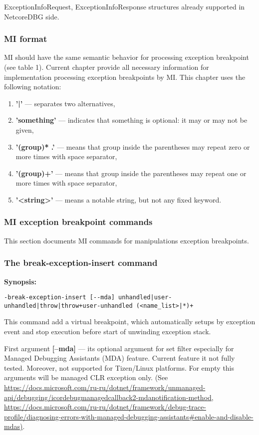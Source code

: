 \documentclass[a4paper,12pt]{article}
\newenvironment{nobr}{\begin{minipage}{\textwidth}\setlength\parskip{1em}
}{\end{minipage}\ignorespacesafterend}
\begin{document}
ExceptionInfoRequest, ExceptionInfoResponse structures already supported in NetcoreDBG side.

\subsubsection{MI format}
MI should have the same semantic behavior for processing exception breakpoint (see table 1). Current chapter provide all necessary information for implementation processing exception breakpoints by MI. This chapter uses the following notation:
\begin{enumerate}
 \item \textbf{'|'} --- separates two alternatives,
 \item \textbf{'something'} --- indicates that something is optional: it may or may not be given,
 \item \textbf{'(group)* .'} --- means that group inside the parentheses may repeat zero or more times with space separator,
 \item \textbf{'(group)+'} --- means that group inside the parentheses may repeat one or more times with space separator,
 \item \textbf{'<string>'} --- means a notable string, but not any fixed keyword.
\end{enumerate}

\subsubsection{MI exception breakpoint commands}
This section documents MI commands for manipulations exception breakpoints.

\begin{nobr}
\subsubsection{The break-exception-insert command}
\textbf{Synopsis:}
\begin{lstlisting}[style=cplusplus,numbers=none]
-break-exception-insert [--mda] unhandled|user-unhandled|throw|throw+user-unhandled (<name_list>|*)+
\end{lstlisting}
\end{nobr}

This command add a virtual breakpoint, which automatically setups by exception event and stop execution before start of unwinding exception stack.

First argument \textbf{[--mda]} --- its optional argument for set filter especially for Managed Debugging Assistants (MDA) feature. Current feature it not fully tested. Moreover, not supported for Tizen/Linux platforms. For empty this arguments will be managed CLR exception only. (See \url{https://docs.microsoft.com/ru-ru/dotnet/framework/unmanaged-api/debugging/icordebugmanagedcallback2-mdanotification-method}, \url{https://docs.microsoft.com/ru-ru/dotnet/framework/debug-trace-profile/diagnosing-errors-with-managed-debugging-assistants#enable-and-disable-mdas)}.
\end{document}
